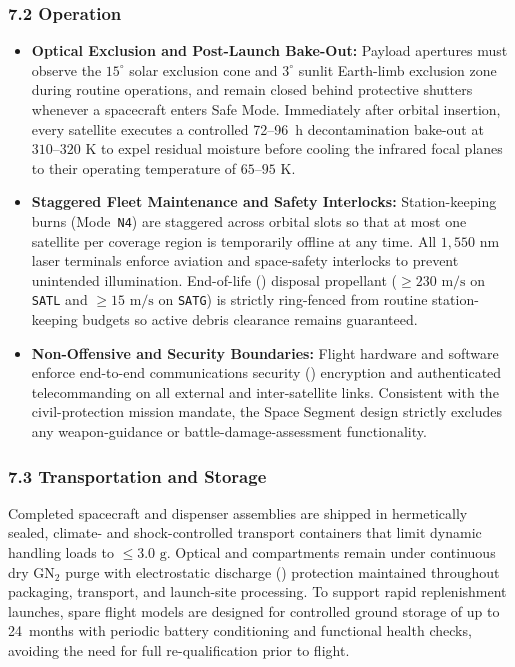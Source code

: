 \subsubsection{7.2 Operation}

\begin{itemize}[leftmargin=*, itemsep=0.35em, topsep=0.25em]
    \item \textbf{Optical Exclusion and Post-Launch Bake-Out:} Payload apertures must observe the $15^\circ$ solar exclusion cone and $3^\circ$ sunlit Earth-limb exclusion zone during routine operations, and remain closed behind protective shutters whenever a spacecraft enters Safe Mode. Immediately after orbital insertion, every satellite executes a controlled 72--96~h decontamination bake-out at $310\text{--}320\text{ K}$ to expel residual moisture before cooling the infrared focal planes to their operating temperature of $65\text{--}95\text{ K}$.
    \item \textbf{Staggered Fleet Maintenance and Safety Interlocks:} Station-keeping burns (Mode~\texttt{N4}) are staggered across orbital slots so that at most one satellite per coverage region is temporarily offline at any time. All $1{,}550\text{ nm}$ laser terminals enforce aviation and space-safety interlocks to prevent unintended illumination. End-of-life () disposal propellant ($\ge 230\text{ m/s}$ on \texttt{SATL} and $\ge 15\text{ m/s}$ on \texttt{SATG}) is strictly ring-fenced from routine station-keeping budgets so active debris clearance remains guaranteed.
    \item \textbf{Non-Offensive and Security Boundaries:} Flight hardware and software enforce end-to-end communications security () encryption and authenticated telecommanding on all external and inter-satellite links. Consistent with the civil-protection mission mandate, the Space Segment design strictly excludes any weapon-guidance or battle-damage-assessment functionality.
\end{itemize}

\subsubsection{7.3 Transportation and Storage}

Completed spacecraft and dispenser assemblies are shipped in hermetically sealed, climate- and shock-controlled transport containers that limit dynamic handling loads to $\le 3.0\text{ g}$. Optical and  compartments remain under continuous dry $\mathrm{GN_2}$ purge with electrostatic discharge () protection maintained throughout packaging, transport, and launch-site processing. To support rapid replenishment launches, spare flight models are designed for controlled ground storage of up to 24~months with periodic battery conditioning and functional health checks, avoiding the need for full re-qualification prior to flight.

